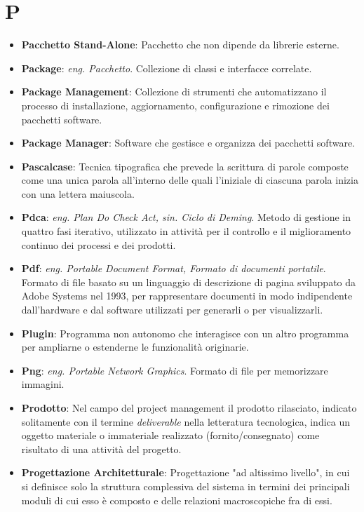 \section*{P}
\begin{itemize}
	\item
	\textbf{Pacchetto Stand-Alone}: Pacchetto che non dipende da librerie esterne.
	\item
	\textbf{Package}: \textit{eng. Pacchetto}. Collezione di classi e interfacce correlate.
	\item
	\textbf{Package Management}: Collezione di strumenti che automatizzano il processo di installazione, aggiornamento, configurazione e rimozione dei pacchetti software.
	\item
	\textbf{Package Manager}: Software che gestisce e organizza dei pacchetti software.
	\item
	\textbf{Pascalcase}: Tecnica tipografica che prevede la scrittura di parole composte come una unica parola all'interno delle quali l'iniziale di ciascuna parola inizia con una lettera maiuscola.
	\item
	\textbf{Pdca}: \textit{eng. Plan Do Check Act, sin. Ciclo di Deming}. Metodo di gestione in quattro fasi iterativo, utilizzato in attività per il controllo e il miglioramento continuo dei processi e dei prodotti.
	\item
	\textbf{Pdf}: \textit{eng. Portable Document Format, Formato di documenti portatile}. Formato di file basato su un linguaggio di descrizione di pagina sviluppato da Adobe Systems nel 1993, per rappresentare documenti in modo indipendente dall'hardware e dal software utilizzati per generarli o per visualizzarli.
	\item
	\textbf{Plugin}: Programma non autonomo che interagisce con un altro programma per ampliarne o estenderne le funzionalità originarie.
	\item
	\textbf{Png}: \textit{eng. Portable Network Graphics}. Formato di file per memorizzare immagini.
	\item
	\textbf{Prodotto}: Nel campo del project management il prodotto rilasciato, indicato solitamente con il termine \textit{deliverable} nella letteratura tecnologica, indica un oggetto materiale o immateriale realizzato (fornito/consegnato) come risultato di una attività del progetto.
	\item
	\textbf{Progettazione Architetturale}: Progettazione "ad altissimo livello", in cui si definisce solo la struttura complessiva del sistema in termini dei principali moduli di cui esso è composto e delle relazioni macroscopiche fra di essi.

\end{itemize}
